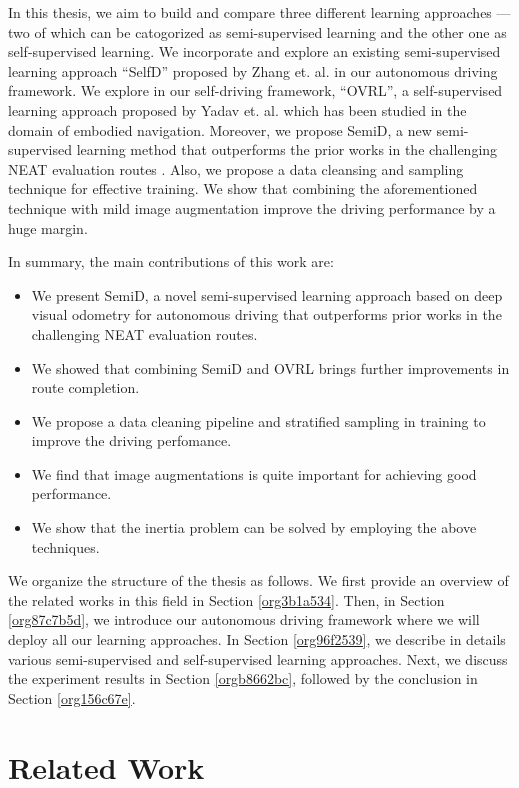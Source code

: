 \documentclass[12pt, letterpaper,cleardoubleempty,BCOR1cm]{scrbook}
\begin{document}
In this thesis, we aim to build and compare three different learning approaches
--- two of which can be catogorized as semi-supervised learning and the other
one as self-supervised learning. We incorporate and explore an existing
semi-supervised learning approach ``SelfD'' proposed by Zhang
et. al. \cite{Zhang2022a} in our autonomous driving framework. We explore in our
self-driving framework, ``OVRL'', a self-supervised learning approach proposed
by Yadav et. al. \cite{Yadav2022} which has been studied in the domain of
embodied navigation. Moreover, we propose SemiD, a new semi-supervised learning
method that outperforms the prior works in the challenging NEAT evaluation
routes \cite{Chitta2021}. Also, we propose a data cleansing and sampling
technique for effective training. We show that combining the aforementioned
technique with mild image augmentation improve the driving performance by a huge
margin.


In summary, the main contributions of this work are:
\begin{itemize}
\item We present SemiD, a novel semi-supervised learning approach based on deep
visual odometry for autonomous driving that outperforms prior works in the
challenging NEAT evaluation routes.
\item We showed that combining SemiD and OVRL brings further improvements in route
completion.
\item We propose a data cleaning pipeline and stratified sampling in training to
improve the driving perfomance.
\item We find that image augmentations is quite important for achieving good performance.
\item We show that the inertia problem can be solved by employing the above techniques.
\end{itemize}

We organize the structure of the thesis as follows. We first provide an overview
of the related works in this field in Section \ref{org3b1a534}. Then, in Section \ref{org87c7b5d}, we introduce
our autonomous driving framework where we will deploy all our learning
approaches. In Section \ref{org96f2539}, we describe in details various
semi-supervised and self-supervised learning approaches. Next, we discuss the
experiment results in Section \ref{orgb8662bc}, followed by the conclusion in Section \ref{org156c67e}.

\chapter{Related Work \label{org3b1a534}}
\label{sec:org182c79a}
\end{document}
